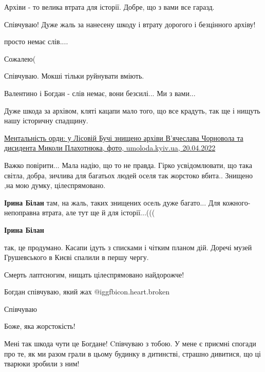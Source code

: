 \begin{itemize}
Архіви - то велика втрата для історії.
Добре, що з вами все гаразд.

Співчуваю! Дуже жаль за нанесену шкоду і втрату дорогого і безцінного архіву!

просто немає слів....

Сожалею(

Співчуваю. Мокші тільки руйнувати вміють.

Валентино і Богдан - слів немає, вони безсилі... Ми з вами...


Дуже шкода за архівом, кляті кацапи мало того, що все крадуть, так ще і нищуть
нашу історичну спадщину.


\href{https://umoloda.kyiv.ua/number/0/196/165736/}{%
Ментальність орди: у Лісовій Бучі знищено архіви В'ячеслава Чорновола та дисидента Миколи Плахотнюка, фото, %
umoloda.kyiv.ua, 20.04.2022%
}


Важко повірити... Мала надію, що то не правда. Гірко усвідомлювати, що така
світла, добра, зичлива для багатьох людей оселя так жорстоко вбита.. Знищено
,на мою думку, цілеспрямовано.

\textbf{Ірина Білан} там, на жаль, таких знищених осель дуже багато...
Для кожного- непоправна втрата, але тут ще й для історії...(((

\textbf{Ірина Білан} 

так, це продумано. Касапи ідуть з списками і чітким планом дій. Доречі музей
Грушевського в Києві спалили в першу чергу.

Смерть лаптєногим, нищать цілеспрямовано найдорожче!

Богдан співчуваю, який жах  @igg{fbicon.heart.broken} 

Співчуваю

Боже, яка жорстокість!


Мені так шкода чути це Богдане! Cпівчуваю з тобою. У мене є приємні спогади про
те, як ми разом грали в цьому будинку в дитинстві, страшно дивитися, що ці
тварюки зробили з ним!



\end{itemize} %
